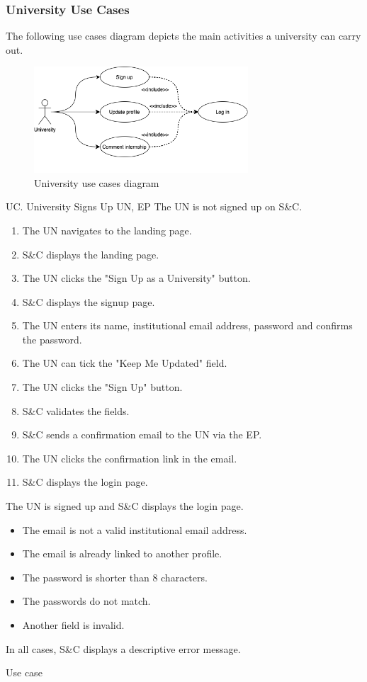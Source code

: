 
\clearpage
\subsubsection{University Use Cases}
The following use cases diagram depicts the main activities a university can carry out.

\begin{figure}[h]
    \centering
    \includegraphics[width=8cm]{images/use-cases-diagrams/university.png}
    \caption{University use cases diagram}
\end{figure}

\begin{usecase}
    {UC\theuc. University Signs Up}
    {UN, EP}
    {The UN is not signed up on S\&C.}
    {\begin{enumerate}[leftmargin=*]
        \item The UN navigates to the landing page.
        \item S\&C displays the landing page.
        \item The UN clicks the "Sign Up as a University" button.
        \item S\&C displays the signup page.
        \item The UN enters its name, institutional email address, password and confirms the password.
        \item The UN can tick the "Keep Me Updated" field.
        \item The UN clicks the "Sign Up" button.
        \item S\&C validates the fields.
        \item S\&C sends a confirmation email to the UN via the EP.
        \item The UN clicks the confirmation link in the email.
        \item S\&C displays the login page.
    \end{enumerate}}
    {The UN is signed up and S\&C displays the login page.}
    {\begin{itemize}[leftmargin=*, label=\tiny\textbullet]
        \item The email is not a valid institutional email address.
        \item The email is already linked to another profile.
        \item The password is shorter than 8 characters.
        \item The passwords do not match.
        \item Another field is invalid.
    \end{itemize}
    In all cases, S\&C displays a descriptive error message.}
    {Use case \theuc}
\end{usecase}

